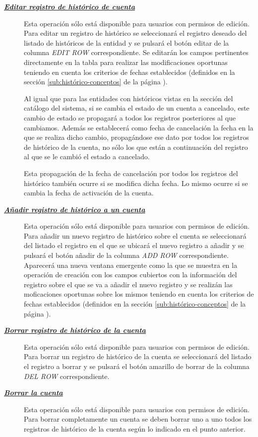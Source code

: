 \begin{description}
\item[\underline{\textsl{\textbf{Editar registro de histórico de cuenta}}}] Esta operación sólo está disponible para usuarios con permisos de edición.
Para editar un registro de histórico se seleccionará el registro deseado del listado de históricos de la entidad y se pulsará el botón editar de la columna \textit{EDIT ROW} correspondiente. Se editarán los campos pertinentes directamente en la tabla para realizar las modificaciones oportunas teniendo en cuenta los criterios de fechas establecidos (definidos en la sección \ref{sub:histórico-conceptos} de la página \pageref{sub:histórico-conceptos}).

Al igual que para las entidades con históricos vistas en la sección del catálogo del sistema, si se cambia el estado de un cuenta a cancelado, este cambio de estado se propagará a todos los registros posteriores al que cambiamos. Además se establecerá como fecha de cancelación la fecha en la que se realiza dicho cambio, propagándose ese dato por todos los registros de histórico de la cuenta, no sólo los que están a continuación del registro al que se le cambió el estado a cancelado.

Esta propagación de la fecha de cancelación por todos los registros del histórico  también ocurre si se modifica dicha fecha. Lo mismo ocurre si se cambia la fecha de activación de la cuenta.

\item[\underline{\textsl{\textbf{Añadir registro de histórico a un cuenta}}}] Esta operación sólo está disponible para usuarios con permisos de edición.
Para añadir un nuevo registro de histórico sobre el cuenta se seleccionará del listado el registro en el que se ubicará el nuevo registro a añadir y se pulsará el botón añadir de la columna \textit{ADD ROW} correspondiente. Aparecerá una nueva ventana emergente como la que se muestra en la operación de creación  con los campos cubiertos con la información del registro sobre el que se va a añadir el nuevo registro y se realizán las moficaciones oportunas sobre los mismos teniendo en cuenta los criterios de fechas establecidos (definidos en la sección \ref{sub:histórico-conceptos} de la página \pageref{sub:histórico-conceptos}).


\item[\underline{\textsl{\textbf{Borrar registro de histórico de la cuenta}}}] Esta operación sólo está disponible para usuarios con permisos de edición.
Para borrar un registro de histórico de la cuenta se seleccionará del listado el registro a borrar y se pulsará el botón amarillo de borrar de la columna \textit{DEL ROW} correspondiente.

\item[\underline{\textsl{\textbf{Borrar la cuenta}}}] Esta operación sólo está disponible para usuarios con permisos de edición.
Para borrar completamente un cuenta se deben borrar uno a uno todos los registros de histórico de la cuenta según lo indicado en el punto anterior. 
\end{description}




